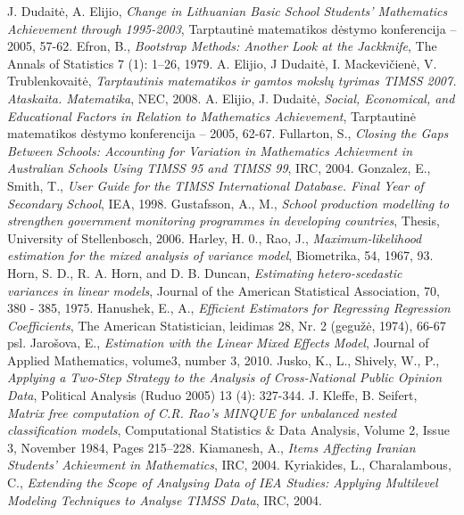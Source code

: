 \documentclass[12pt,a4paper]{article}
\begin{document}
\begin{thebibliography}{1}
 J. Dudaitė, A. Elijio, \textit{Change in Lithuanian Basic School Students’ Mathematics Achievement through 1995-2003}, Tarptautinė matematikos dėstymo konferencija – 2005, 57-62.
 Efron, B., \textit{Bootstrap Methods: Another Look at the Jackknife}, The Annals of Statistics 7 (1): 1–26, 1979.
 A. Elijio, J Dudaitė, I. Mackevičienė, V. Trublenkovaitė, \textit{Tarptautinis matematikos ir gamtos mokslų tyrimas TIMSS 2007. Ataskaita. Matematika}, NEC, 2008.
 A. Elijio, J. Dudaitė, \textit{Social, Economical, and Educational Factors in Relation to Mathematics Achievement}, Tarptautinė matematikos dėstymo konferencija – 2005, 62-67.
 Fullarton, S., \textit{Closing the Gaps Between Schools: Accounting for Variation in Mathematics Achievment in Australian Schools Using TIMSS 95 and TIMSS 99}, IRC, 2004.
 Gonzalez, E., Smith, T., \textit{User Guide for the TIMSS International Database. Final Year of Secondary School}, IEA, 1998.
 Gustafsson, A., M., \textit{School production modelling to strengthen government monitoring programmes in developing countries}, Thesis, University of Stellenbosch, 2006.
 Harley, H. 0., Rao, J., \textit{Maximum-likelihood estimation for the mixed analysis of variance model}, Biometrika, 54, 1967, 93.
 Horn, S. D., R. A. Horn, and D. B. Duncan, \textit{Estimating hetero-scedastic variances in linear models}, Journal of the American Statistical Association, 70, 380 - 385, 1975.
 Hanushek, E., A., \textit{Efficient Estimators for Regressing Regression Coefficients}, The American Statistician, leidimas 28, Nr. 2 (gegužė, 1974), 66-67 psl.
 Jarošova, E., \textit{Estimation with the Linear Mixed Effects Model}, Journal of Applied Mathematics, volume3, number 3, 2010.
 Jusko, K., L., Shively, W., P., \textit{Applying a Two-Step Strategy to the Analysis of Cross-National Public Opinion Data}, Political Analysis (Ruduo 2005) 13 (4): 327-344. 
 J. Kleffe, B. Seifert, \textit{Matrix free computation of C.R. Rao's MINQUE for unbalanced nested classification models}, Computational Statistics \& Data Analysis, Volume 2, Issue 3, November 1984, Pages 215–228.
 Kiamanesh, A., \textit{Items Affecting Iranian Students' Achievment in Mathematics}, IRC, 2004.
 Kyriakides, L., Charalambous, C., \textit{ Extending the Scope of Analysing Data of IEA Studies: Applying Multilevel Modeling Techniques to Analyse TIMSS Data}, IRC, 2004.

\end{thebibliography}
\end{document}
